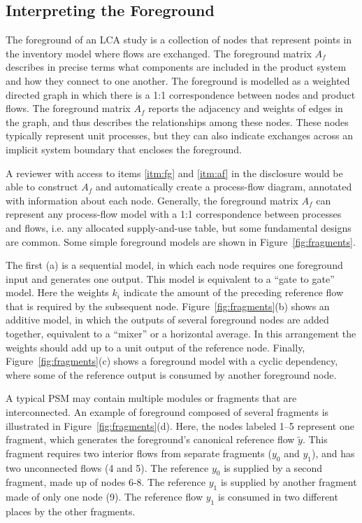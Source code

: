 \subsection{Interpreting the Foreground}

The foreground of an LCA study is a collection of nodes that represent points in the inventory model where flows are exchanged.  The foreground matrix $A_f$ describes in precise terms what components are included in the product system and how they connect to one another.  The foreground is modelled as a weighted directed graph in which there is a 1:1 correspondence between nodes and product flows.  The foreground matrix $A_f$ reports the adjacency and weights of edges in the graph, and thus describes the relationships among these nodes.  These nodes typically represent unit processes, but they can also indicate exchanges across an implicit system boundary that encloses the foreground.

A reviewer with access to items \ref{itm:fg} and \ref{itm:af} in the disclosure would be able to construct $A_f$ and automatically create a process-flow diagram, annotated with information about each node.  Generally, the foreground matrix $A_f$ can represent any process-flow model with a 1:1 correspondence between processes and flows, i.e. any allocated supply-and-use table, but some fundamental designs are common.  Some simple foreground models are shown in Figure~\ref{fig:fragments}.  



The first (a) is a sequential model, in which each node requires one foreground input and generates one output. This model is equivalent to a ``gate to gate'' model.  Here the weights $k_i$ indicate the amount of the preceding reference flow that is required by the subsequent node.  Figure~\ref{fig:fragments}(b) shows an additive model, in which the outputs of several foreground nodes are added together, equivalent to a ``mixer'' or a horizontal average.  In this arrangement the weights %
should add up to a unit output of the reference node.  Finally, Figure~\ref{fig:fragments}(c) shows a foreground model with a cyclic dependency, where some of the reference output is consumed by another foreground node.

A typical PSM may contain multiple modules or fragments that are interconnected.  An example of foreground composed of several fragments is illustrated in Figure~\ref{fig:fragments}(d).  Here, the nodes labeled 1--5 represent one fragment, which generates the foreground's canonical reference flow $\tilde{y}$. This fragment requires two interior flows from separate fragments ($y_0$ and $y_1$), and has two unconnected flows (4 and 5).  The reference $y_0$ is supplied by a second fragment, made up of nodes 6-8.  The reference $y_1$ is supplied by another fragment made of only one node (9). The reference flow $y_1$ is consumed in two different places by the other fragments.




